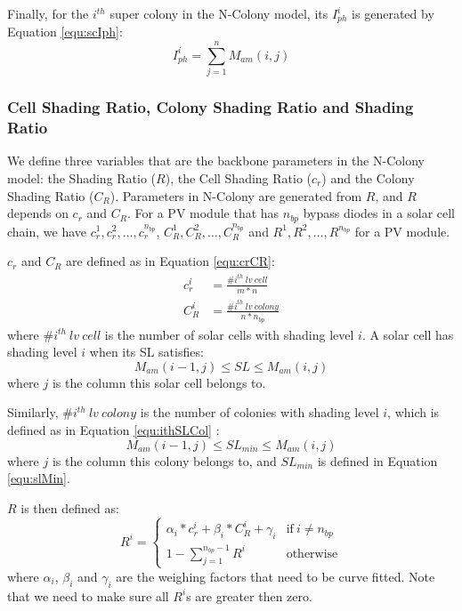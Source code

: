 Finally, for the $i^{th}$ super colony in the N-Colony model, its $I_{ph}^i$ is generated by Equation \ref{equ:scIph}:
\begin{equation}\label{equ:scIph}
  I_{ph}^i = \sum_{j=1}^n{M_{am}(i,j)}
\end{equation}

\subsubsection{Cell Shading Ratio, Colony Shading Ratio and Shading Ratio}
We define three variables that are the backbone parameters in the N-Colony model: the Shading Ratio ($R$), the Cell Shading Ratio ($c_r$) and the Colony Shading Ratio ($C_R$). Parameters in N-Colony are generated from $R$, and $R$ depends on $c_r$ and $C_R$. For a PV module that has $n_{bp}$ bypass diodes in a solar cell chain, we have $c_r^1, c_r^2, \dots, c_r^{n_{bp}}$, $C_R^1,C_R^2,\dots,C_R^{n_{bp}}$ and $R^1,R^2,\dots,R^{n_{bp}}$ for a PV module.

$c_r$ and $C_R$ are defined as in Equation \ref{equ:crCR}:
\begin{equation}\label{equ:crCR}
\begin{aligned}
  c_r^i & = \frac{\#i^{th}\ lv\ cell}{m*n} \\
  C_R^i & = \frac{\#i^{th}\ lv\ colony}{n*n_{bp}}
\end{aligned}
\end{equation}
where $\#i^{th}\ lv\ cell$ is the number of solar cells with shading level $i$. A solar cell has shading level $i$ when its SL satisfies:
\begin{equation}\label{equ:ithSLCell}
M_{am} (i-1, j) \le SL \le M_{am} (i, j)
\end{equation}
where $j$ is the column this solar cell belongs to.

Similarly, $\#i^{th}\ lv\ colony$ is the number of colonies with shading level $i$, which is defined as in Equation \ref{equ:ithSLCol} :
\begin{equation}\label{equ:ithSLCol}
M_{am} (i-1, j) \le SL_{min} \le M_{am} (i, j)
\end{equation}
where $j$ is the column this colony belongs to, and $SL_{min}$ is defined in Equation \ref{equ:slMin}.

$R$ is then defined as:
\begin{equation}\label{equ:rDef}
R^i =
    \begin{cases}
      \alpha_i*c_r^i+ \beta_i*C_R^i+ \gamma_i  & \text{if}\  i \neq n_{bp}\\
      1 - \sum_{j = 1}^{n_{bp}-1}{R^i} & \text{otherwise}
     \end{cases}
\end{equation}
where $\alpha_i$, $\beta_i$ and $\gamma_i$ are the weighing factors that need to be curve fitted. Note that we need to make sure all $R^i$s are greater then zero.

